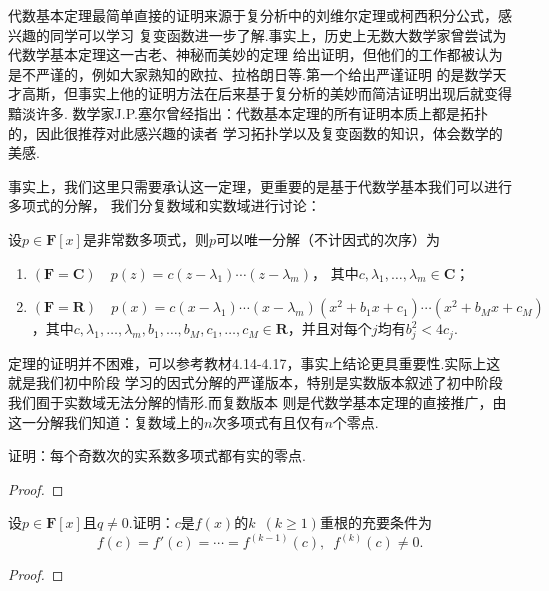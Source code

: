 代数基本定理最简单直接的证明来源于复分析中的刘维尔定理或柯西积分公式，感兴趣的同学可以学习
复变函数进一步了解.事实上，历史上无数大数学家曾尝试为代数学基本定理这一古老、神秘而美妙的定理
给出证明，但他们的工作都被认为是不严谨的，例如大家熟知的欧拉、拉格朗日等.第一个给出严谨证明
的是数学天才高斯，但事实上他的证明方法在后来基于复分析的美妙而简洁证明出现后就变得黯淡许多.
数学家J.P.塞尔曾经指出：代数基本定理的所有证明本质上都是拓扑的，因此很推荐对此感兴趣的读者
学习拓扑学以及复变函数的知识，体会数学的美感.

事实上，我们这里只需要承认这一定理，更重要的是基于代数学基本我们可以进行多项式的分解，
我们分复数域和实数域进行讨论：
\begin{theorem} \label{thm:14:多项式分解}
    设$p\in\mathbf{F}[x]$是非常数多项式，则$p$可以唯一分解（不计因式的次序）为
    \begin{enumerate}
        \item $(\mathbf{F}=\mathbf{C})\quad p(z)=c(z-\lambda_1)\cdots(z-\lambda_m)$，
        其中$c,\lambda_1,\ldots,\lambda_m\in\mathbf{C}$；

        \item $(\mathbf{F}=\mathbf{R})\quad p(x)=c(x-\lambda_1)\cdots(x-\lambda_m)
        (x^2+b_1x+c_1)\cdots(x^2+b_Mx+c_M)$，其中$c,\lambda_1,\ldots,\lambda_m,b_1,\ldots,b_M,
        c_1,\ldots,c_M\in\mathbf{R}$，并且对每个$j$均有$b_j^2<4c_j$.
    \end{enumerate}
\end{theorem}
定理的证明并不困难，可以参考教材4.14-4.17，事实上结论更具重要性.实际上这就是我们初中阶段
学习的因式分解的严谨版本，特别是实数版本叙述了初中阶段我们囿于实数域无法分解的情形.而复数版本
则是代数学基本定理的直接推广，由这一分解我们知道：复数域上的$n$次多项式有且仅有$n$个零点.
\begin{example}
    证明：每个奇数次的实系数多项式都有实的零点.
\end{example}
\begin{proof}
    
\end{proof}

\begin{example}
    设$p\in\mathbf{F}[x]$且$q\neq 0$.证明：$c$是$f(x)$的$k\enspace(k\geqslant 1)$重根的充要条件为
    \[f(c)=f'(c)=\cdots=f^{(k-1)}(c),\enspace f^{(k)}(c)\neq 0.\]
\end{example}
\begin{proof}
    
\end{proof}

